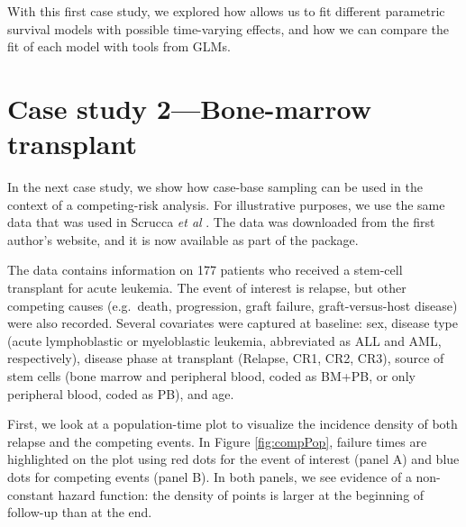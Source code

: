 With this first case study, we explored how  allows us to
fit different parametric survival models with possible time-varying
effects, and how we can compare the fit of each model with tools from
GLMs.

\hypertarget{case-study-2bone-marrow-transplant}{%
\section{Case study 2---Bone-marrow
transplant}\label{case-study-2bone-marrow-transplant}}

In the next case study, we show how case-base sampling can be used in
the context of a competing-risk analysis. For illustrative purposes, we
use the same data that was used in Scrucca \emph{et al}
\citeyearpar{scrucca2010regression}. The data was downloaded from the
first author's website, and it is now available as part of the
 package.

The data contains information on 177 patients who received a stem-cell
transplant for acute leukemia. The event of interest is relapse, but
other competing causes (e.g.~death, progression, graft failure,
graft-versus-host disease) were also recorded. Several covariates were
captured at baseline: sex, disease type (acute lymphoblastic or
myeloblastic leukemia, abbreviated as ALL and AML, respectively),
disease phase at transplant (Relapse, CR1, CR2, CR3), source of stem
cells (bone marrow and peripheral blood, coded as BM+PB, or only
peripheral blood, coded as PB), and age.

First, we look at a population-time plot to visualize the incidence
density of both relapse and the competing events. In Figure
\ref{fig:compPop}, failure times are highlighted on the plot using red
dots for the event of interest (panel A) and blue dots for competing
events (panel B). In both panels, we see evidence of a non-constant
hazard function: the density of points is larger at the beginning of
follow-up than at the end.

